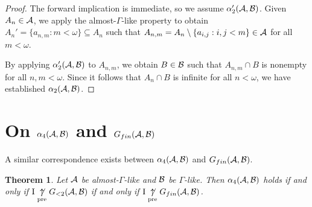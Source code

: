 \documentclass{amsart}
\theoremstyle{plain}
\newtheorem{theorem}{Theorem}
\theoremstyle{definition}
\theoremstyle{remark}
\theoremstyle{plain}
\theoremstyle{definition}
\theoremstyle{remark}
\begin{document}
\begin{proof}
The forward implication is immediate, so we assume \(\alpha_2'(\mathcal{A},\mathcal{B})\).
Given \(A_n\in\mathcal{A}\), we apply the almost-\(\Gamma\)-like property to obtain
\(A_n'=\{a_{n,m}:m<\omega\}\subseteq A_n\) such that
\(A_{n,m}=A_n\setminus\{a_{i,j}:i,j<m\}\in\mathcal{A}\) for all \(m<\omega\).

By applying \(\alpha_2'(\mathcal{A},\mathcal{B})\) to \(A_{n,m}\), we obtain
\(B\in\mathcal{B}\) such that \(A_{n,m}\cap B\) is nonempty for all \(n,m<\omega\).
Since it follows that \(A_n\cap B\) is infinite for all \(n<\omega\),
we have established \(\alpha_2(\mathcal{A},\mathcal{B})\).
\end{proof}

\section{On \(\alpha_4(\mathcal{A},\mathcal{B})\) and \(G_{fin}(\mathcal{A},\mathcal{B})\)}

A similar correspondence exists between \(\alpha_4(\mathcal{A},\mathcal{B})\)
and \(G_{fin}(\mathcal{A},\mathcal{B})\).

\begin{theorem}
Let \(\mathcal{A}\) be almost-\(\Gamma\)-like and \(\mathcal{B}\) be \(\Gamma\)-like. 
Then \(\alpha_4(\mathcal{A},\mathcal{B})\) holds if and only
if \(\mathrm{I}\underset{\text{pre}}{\not\uparrow} G_{<2}(\mathcal{A},\mathcal{B})\) if and only if
\(\mathrm{I}\underset{\text{pre}}{\not\uparrow} G_{fin}(\mathcal{A},\mathcal{B})\).
\end{theorem}
\end{document}
